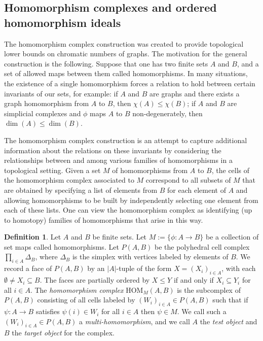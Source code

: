 \documentclass[11pt]{amsart}
\theoremstyle{definition}
\newtheorem{definition}[theorem]{Definition}
\numberwithin{equation}{section}
\theoremstyle{remark}
\numberwithin{equation}{section}
\begin{document}
\subsection{Homomorphism complexes and ordered homomorphism ideals}

The homomorphism complex construction was created to provide topological lower bounds on chromatic numbers of graphs.
The motivation for the general construction is the following.
Suppose that one has two finite sets $A$ and $B$, and a set of allowed maps between them called homomorphisms.
In many situations, the existence of a single homomorphism forces a relation to hold between certain invariants of our sets, for example: if $A$ and $B$ are graphs and there exists a graph homomorphism from $A$ to $B$, then $\chi(A)\leq \chi(B)$; if $A$ and $B$ are simplicial complexes and $\phi$ maps $A$ to $B$ non-degenerately, then $\dim(A)\leq \dim(B)$.

The homomorphism complex construction is an attempt to capture additional information about the relations on these invariants by considering the relationships between and among various families of homomorphisms in a topological setting.
Given a set $M$ of homomorphisms from $A$ to $B$, the cells of the homomorphism complex associated to $M$ correspond to all subsets of $M$ that are obtained by specifying a list of elements from $B$ for each element of $A$ and allowing homomorphisms to be built by independently selecting one element from each of these lists.
One can view the homomorphism complex as identifying (up to homotopy) families of homomorphisms that arise in this way.

\begin{definition}
Let $A$ and $B$ be finite sets.  
Let $M:=\{ \phi:A\rightarrow B \}$  be a collection of set maps called homomorphisms.  
Let $P(A,B)$ be the polyhedral cell complex $\prod_{i\in A}\Delta_B$, where $\Delta_B$ is the simplex with vertices labeled by elements of $B$.  
We record a face of $P(A,B)$ by an $|A|$-tuple of the form $X=(X_i)_{i\in A}$, with each $\emptyset \neq X_i\subseteq B$.
The faces are partially ordered by $X\leq Y$ if and only if $X_i\subseteq Y_i$ for all $i\in A$.  
The \emph{homomorphism complex} $\mathrm{HOM}_M(A,B)$ is the subcomplex of $P(A,B)$ consisting of all cells labeled by $(W_i)_{i\in A}\in P(A,B)$ such that if $\psi:A\rightarrow B$ satisfies $\psi(i)\in W_i$ for all $i\in A$ then $\psi\in M$.  
We call such a $(W_i)_{i\in A}\in P(A,B)$ a \textit{multi-homomorphism}, and we call $A$ the \textit{test object} and $B$ the \textit{target object} for the complex.
\end{definition}
\end{document}
